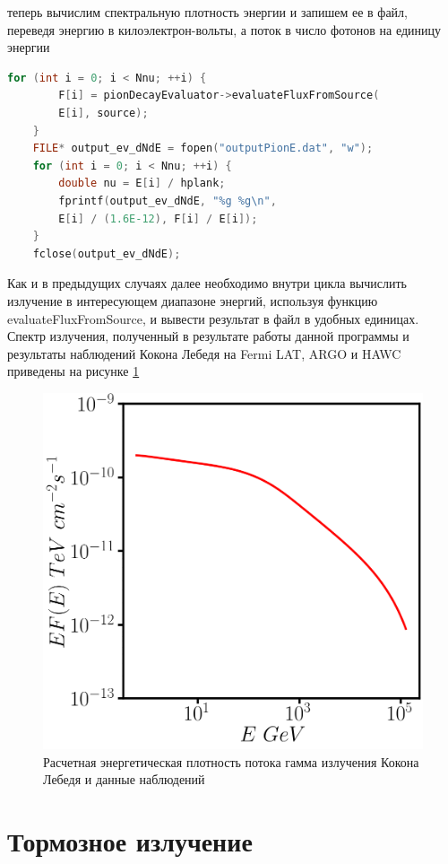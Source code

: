 теперь вычислим спектральную плотность энергии и запишем ее в файл, переведя энергию в килоэлектрон-вольты, а поток в число фотонов на единицу энергии
\begin{lstlisting}[language=c++]
	for (int i = 0; i < Nnu; ++i) {
		F[i] = pionDecayEvaluator->evaluateFluxFromSource(
		E[i], source);
	}	
	FILE* output_ev_dNdE = fopen("outputPionE.dat", "w");
	for (int i = 0; i < Nnu; ++i) {
		double nu = E[i] / hplank;
		fprintf(output_ev_dNdE, "%g %g\n",
		E[i] / (1.6E-12), F[i] / E[i]);
	}
	fclose(output_ev_dNdE);
\end{lstlisting}
Как и в предыдущих случаях далее необходимо внутри цикла вычислить излучение в интересующем диапазоне энергий, используя функцию evaluateFluxFromSource, и вывести результат в файл в удобных единицах. Спектр излучения, полученный в результате работы данной программы и результаты наблюдений Кокона Лебедя на Fermi LAT, ARGO и HAWC \cite{Ackermann2011, Bartoli2014, Abeysekara2021} приведены на рисунке \ref{pion}
\begin{figure}
	\centering
	\includegraphics[width=12.5 cm]{./fig/pion.png} 
	\caption{Расчетная энергетическая плотность потока гамма излучения Кокона Лебедя и данные наблюдений}
	\label{pion}
\end{figure}
\section{Тормозное излучение}

